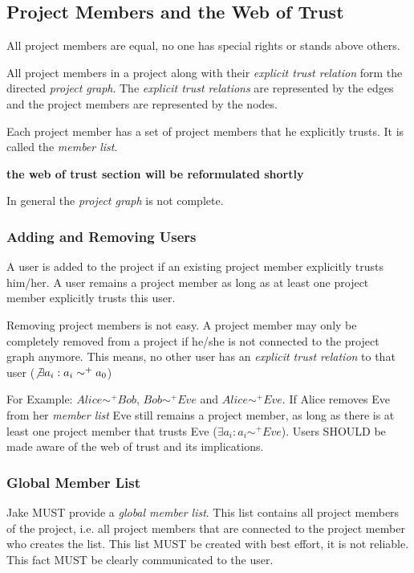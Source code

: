 \subsection{Project Members and the Web of Trust}
All project members are equal, no one has special rights or stands above others.

All project members in a project along with their \emph{explicit trust relation} form the directed \emph{project graph}. The \emph{explicit trust relations} are represented by the edges and the project members are represented by the nodes.

Each project member has a set of project members that he explicitly trusts. It is called the \emph{member list}.

\textbf{the web of trust section will be reformulated shortly}

In general the \emph{project graph} is not complete.

\subsubsection{Adding and Removing Users}
A user is added to the project if an existing project member explicitly trusts him/her. A user remains a project member as long as at least one project member explicitly trusts this user.

Removing project members is not easy. A project member may only be completely removed from a project if he/she is not connected to the project graph anymore.
This means, no other user has an \emph{explicit trust relation} to that user ($\not\exists a_i: a_i \sim ^+ a_0$)

For Example: $Alice \sim ^+ Bob$, $Bob \sim ^+ Eve$ and $Alice \sim ^+ Eve$. If Alice removes Eve from her \emph{member list}  Eve still remains a project member, as long as there is at least one project member that trusts Eve ($\exists a_i: a_i \sim ^+ Eve$). Users SHOULD be made aware of the web of trust and its implications.

\subsubsection{Global Member List}
Jake MUST provide a \emph{global member list}. This list contains all project members of the project, i.e. all project members that are connected to the project member who creates the list. This list MUST be created with best effort, it is not reliable. This fact MUST be clearly communicated to the user.

